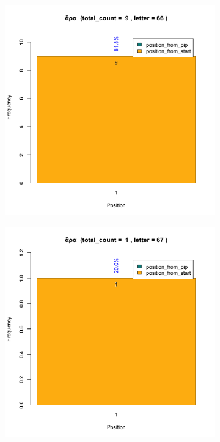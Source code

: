 \documentclass[a4paper]{article}
\begin{document}
\begin{figure}
\begin{subfigure}{0.45\textwidth}
\centering
\includegraphics[width=1\linewidth]{../../data/output/paul_R_par/plots/par13_lt66.png}
\end{subfigure}
\begin{subfigure}{0.45\textwidth}
\centering
\includegraphics[width=1\linewidth]{../../data/output/paul_R_par/plots/par13_lt67.png}

\end{subfigure}
\end{figure}
\end{document}
